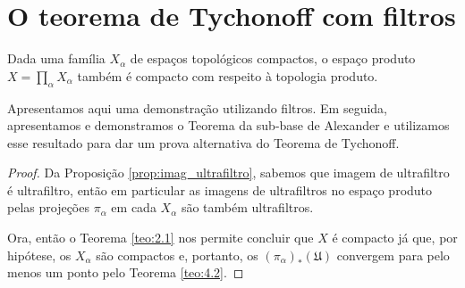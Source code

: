 \section{O teorema de Tychonoff com filtros}
\label{sec:tychonoff}

 \begin{theorem}[Thychonoff]
 \label{teo:tychonoff}
 Dada uma família
 $X_{\alpha}$
 de espaços topológicos compactos,
 o espaço produto
 $X = \displaystyle{ \prod_{\alpha} X_{\alpha} }$
 também é compacto com respeito à topologia produto.
 \end{theorem}
 
 Apresentamos aqui uma demonstração utilizando filtros.
 Em seguida, apresentamos e demonstramos o Teorema
 da sub-base de Alexander e utilizamos esse resultado
 para dar um prova alternativa do Teorema de Tychonoff.
 
 \begin{proof}
 
 
 
 
 Da Proposição \ref{prop:imag_ultrafiltro},
 sabemos que imagem de ultrafiltro é ultrafiltro,
 então em particular as imagens de ultrafiltros no
 espaço produto pelas projeções
 $\pi_{\alpha}$
 em cada
 $X_{\alpha}$
 são também ultrafiltros.
 
 
 Ora, então o Teorema \ref{teo:2.1}
 nos permite concluir que 
 $X$
 é compacto já que, por hipótese, os
 $X_{\alpha}$ 
 são compactos e, portanto, os
 $(\pi_{\alpha})_*(\mathfrak{U})$
 convergem para pelo menos um ponto pelo
 Teorema \ref{teo:4.2}.
 \end{proof}